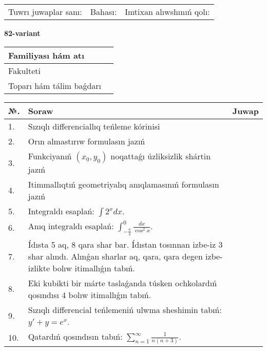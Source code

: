 \documentclass{article}
\begin{document}
\vspace{1cm}

\begin{tabular}{ c c c }
Tuwrı juwaplar sanı: \underline{\hspace{2cm}} & Bahası: \underline{\hspace{2cm}} & Imtixan alıwshınıń qolı: \underline{\hspace{2cm}} \\
\end{tabular}

\newpage

\begin{center}\textbf{82-variant}\end{center}

\bgroup
\def\arraystretch{1.5}
\begin{tabular}{ |m{6cm}|m{10cm}| }
  \hline
  Familiyası hám atı & \\
  \hline
  Fakulteti &\\
  \hline
  Toparı hám tálim baǵdarı & \\
  \hline
\end{tabular}
\egroup

\vspace{0.5cm}

\bgroup
\def\arraystretch{2}
\begin{tabular}{ |l|m{8cm}|m{7cm}| }
  \hline
  №. & Soraw & Juwap \\
  \hline
  1. & Sızıqlı differenciallıq teńleme kórinisi &  \\
  \hline
  2. & Orın almastırıw formulasın jazıń &  \\
  \hline
  3. & Funkciyanıń $(x_{0}, y_{0})$ noqattaǵı úzliksizlik shártin jazıń &  \\
  \hline
  4. & Itimmallıqtıń geometriyalıq anıqlamasınıń formulasın jazıń &  \\
  \hline
  5. & Integraldı esaplań: $\displaystyle\int {2^{x}dx} $. &  \\
  \hline
  6. & Anıq integraldı esaplań: $\displaystyle\int_{-\frac{\pi}{4}}^{0}\frac{dx}{\cos^{2}x}$. &  \\
  \hline
  7. & Ídısta 5 aq, 8 qara shar bar. Ídıstan tosınnan izbe-iz 3 shar alındı. Alınǵan sharlar aq, qara, qara degen izbe-izlikte bolıw itimallıǵın tabıń. &  \\
  \hline
  8. & Eki kubikti bir márte taslaǵanda túsken ochkolardıń qosındısı 4 bolıw itimallıǵın tabıń. &  \\
  \hline
  9. & Sızıqlı differencial teńlemeniń ulwma sheshimin tabıń: $y' + y =e^{x}$. &  \\
  \hline
  10. & Qatardıń qosındısın tabıń: $\displaystyle\sum_{n = 1}^{\infty}\frac{1}{n(n + 3)}$. &  \\
  \hline
\end{tabular}
\egroup
\end{document}
